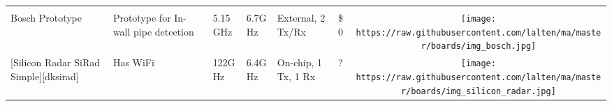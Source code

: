 \begin{longtable}[]{@{}llllllc@{}}
\begin{minipage}[t]{0.10\columnwidth}
\end{minipage}\tabularnewline
\begin{minipage}[t]{0.09\columnwidth}\raggedright\strut
Bosch Prototype\strut
\end{minipage} & \begin{minipage}[t]{0.13\columnwidth}\raggedright\strut
Prototype for In-wall pipe detection\strut
\end{minipage} & \begin{minipage}[t]{0.09\columnwidth}\raggedright\strut
5.15GHz\strut
\end{minipage} & \begin{minipage}[t]{0.11\columnwidth}\raggedright\strut
6.7GHz\strut
\end{minipage} & \begin{minipage}[t]{0.10\columnwidth}\raggedright\strut
External, 2 Tx/Rx\strut
\end{minipage} & \begin{minipage}[t]{0.15\columnwidth}\raggedright\strut
\$0\strut
\end{minipage} & \begin{minipage}[t]{0.10\columnwidth}\centering\strut
\texttt{[image: https://raw.githubusercontent.com/lalten/ma/master/boards/img\_bosch.jpg]}\strut
\end{minipage}\tabularnewline
\begin{minipage}[t]{0.09\columnwidth}\raggedright\strut
{[}Silicon Radar SiRad Simple{]}{[}dksirad{]}\strut
\end{minipage} & \begin{minipage}[t]{0.13\columnwidth}\raggedright\strut
Has WiFi\strut
\end{minipage} & \begin{minipage}[t]{0.09\columnwidth}\raggedright\strut
122GHz\strut
\end{minipage} & \begin{minipage}[t]{0.11\columnwidth}\raggedright\strut
6.4GHz\strut
\end{minipage} & \begin{minipage}[t]{0.10\columnwidth}\raggedright\strut
On-chip, 1 Tx, 1 Rx\strut
\end{minipage} & \begin{minipage}[t]{0.15\columnwidth}\raggedright\strut
?\strut
\end{minipage} & \begin{minipage}[t]{0.10\columnwidth}\centering\strut
\texttt{[image: https://raw.githubusercontent.com/lalten/ma/master/boards/img\_silicon\_radar.jpg]}

\end{minipage}
\end{longtable}
